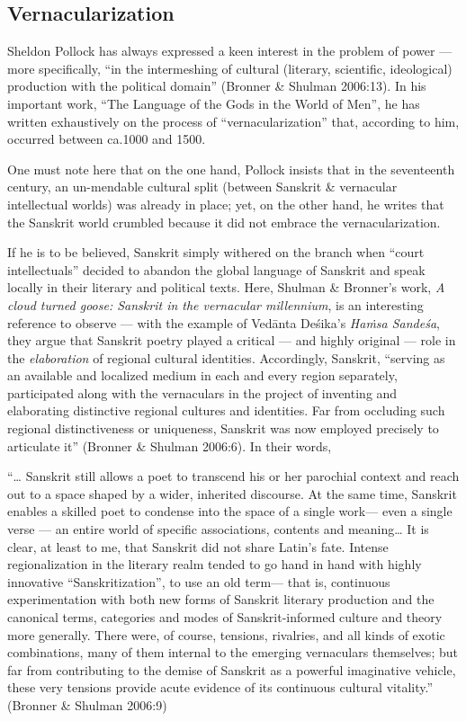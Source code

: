 \subsection{Vernacularization}%
Sheldon Pollock has always expressed a keen interest in the problem of power — more specifically, “in the intermeshing of cultural (literary, scientific, ideological) production with the political domain” (Bronner \& Shulman 2006:13). In his important work, “The Language of the Gods in the World of Men”, he has written exhaustively on the process of “vernacularization” that, according to him, occurred between ca.1000 and 1500.

One must note here that on the one hand, Pollock insists that in the seventeenth century, an un-mendable cultural split (between Sanskrit \& vernacular intellectual worlds) was already in place; yet, on the other hand, he writes that the Sanskrit world crumbled because it did not embrace the vernacularization.

If he is to be believed, Sanskrit simply withered on the branch when “court intellectuals” decided to abandon the global language of Sanskrit and speak locally in their literary and political texts. Here, Shulman \& Bronner’s work, {\sl A cloud turned goose: Sanskrit in the vernacular millennium}, is an interesting reference to observe — with the example of Vedānta Deśika’s {\sl Haṁsa Sandeśa}, they argue that Sanskrit poetry played a critical — and highly original — role in the {\sl elaboration} of regional cultural identities. Accordingly, Sanskrit, “serving as an available and localized medium in each and every region separately, participated along with the vernaculars in the project of inventing and elaborating distinctive regional cultures and identities. Far from occluding such regional distinctiveness or uniqueness, Sanskrit was now employed precisely to articulate it” (Bronner \& Shulman 2006:6). In their words,
\begin{myquote}
“… Sanskrit still allows a poet to transcend his or her parochial context and reach out to a space shaped by a wider, inherited discourse. At the same time, Sanskrit enables a skilled poet to condense into the space of a single work— even a single verse — an entire world of specific associations, contents and meaning… It is clear, at least to me, that Sanskrit did not share Latin’s fate. Intense regionalization in the literary realm tended to go hand in hand with highly innovative “Sanskritization”, to use an old term— that is, continuous experimentation with both new forms of Sanskrit literary production and the canonical terms, categories and modes of Sanskrit-informed culture and theory more generally. There were, of course, tensions, rivalries, and all kinds of exotic combinations, many of them internal to the emerging vernaculars themselves; but far from contributing to the demise of Sanskrit as a powerful imaginative vehicle, these very tensions provide acute evidence of its continuous cultural vitality.”	
\hfill{(Bronner \& Shulman 2006:9)}
\end{myquote}

